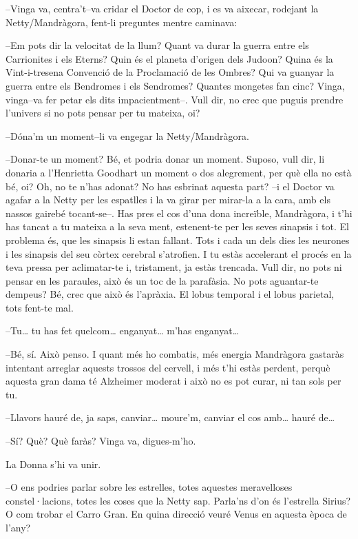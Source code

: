 --Vinga va, centra't--va cridar el Doctor de cop, i es va aixecar,
rodejant la Netty/Mandràgora, fent-li preguntes mentre caminava:

--Em pots dir la velocitat de la llum? Quant va durar la guerra entre
els Carrionites i els Eterns? Quin és el planeta d'origen dels Judoon?
Quina és la Vint-i-tresena Convenció de la Proclamació de les Ombres?
Qui va guanyar la guerra entre els Bendromes i els Sendromes? Quantes
mongetes fan cinc? Vinga, vinga--va fer petar els dits impacientment--.
Vull dir, no crec que puguis prendre l'univers si no pots pensar per tu
mateixa, oi?

--Dóna'm un moment--li va engegar la Netty/Mandràgora.

--Donar-te un moment? Bé, et podria donar un moment. Suposo, vull dir,
li donaria a l'Henrietta Goodhart un moment o dos alegrement, per què
ella no està bé, oi? Oh, no te n'has adonat? No has esbrinat aquesta
part? --i el Doctor va agafar a la Netty per les espatlles i la va girar
per mirar-la a la cara, amb els nassos gairebé tocant-se--. Has pres el
cos d'una dona increïble, Mandràgora, i t'hi has tancat a tu mateixa a
la seva ment, estenent-te per les seves sinapsis i tot. El problema és,
que les sinapsis li estan fallant. Tots i cada un dels dies les neurones
i les sinapsis del seu còrtex cerebral s'atrofien. I tu estàs accelerant
el procés en la teva pressa per aclimatar-te i, tristament, ja estàs
trencada. Vull dir, no pots ni pensar en les paraules, això és un toc de
la parafàsia. No pots aguantar-te dempeus? Bé, crec que això és
l'apràxia. El lobus temporal i el lobus parietal, tots fent-te mal.

--Tu\ldots{} tu has fet quelcom\ldots{} enganyat\ldots{} m'has
enganyat\ldots{}

--Bé, sí. Això penso. I quant més ho combatis, més energia Mandràgora
gastaràs intentant arreglar aquests trossos del cervell, i més t'hi
estàs perdent, perquè aquesta gran dama té Alzheimer moderat i això no
es pot curar, ni tan sols per tu.

--Llavors hauré de, ja saps, canviar\ldots{} moure'm, canviar el cos
amb\ldots{} hauré de\ldots{}

--Sí? Què? Què faràs? Vinga va, digues-m'ho.

La Donna s'hi va unir.

--O ens podries parlar sobre les estrelles, totes aquestes meravelloses
constel·lacions, totes les coses que la Netty sap. Parla'ns d'on és
l'estrella Sirius? O com trobar el Carro Gran. En quina direcció veuré
Venus en aquesta època de l'any?

